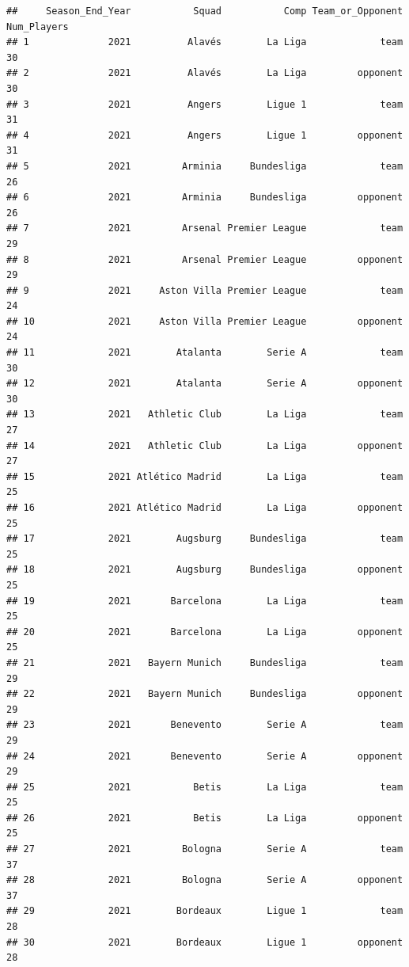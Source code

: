 \documentclass[
]{book}
\theoremstyle{definition}
\theoremstyle{definition}
\theoremstyle{definition}
\theoremstyle{definition}
\theoremstyle{remark}
\begin{document}
\begin{verbatim}
##     Season_End_Year           Squad           Comp Team_or_Opponent Num_Players
## 1              2021          Alavés        La Liga             team          30
## 2              2021          Alavés        La Liga         opponent          30
## 3              2021          Angers        Ligue 1             team          31
## 4              2021          Angers        Ligue 1         opponent          31
## 5              2021         Arminia     Bundesliga             team          26
## 6              2021         Arminia     Bundesliga         opponent          26
## 7              2021         Arsenal Premier League             team          29
## 8              2021         Arsenal Premier League         opponent          29
## 9              2021     Aston Villa Premier League             team          24
## 10             2021     Aston Villa Premier League         opponent          24
## 11             2021        Atalanta        Serie A             team          30
## 12             2021        Atalanta        Serie A         opponent          30
## 13             2021   Athletic Club        La Liga             team          27
## 14             2021   Athletic Club        La Liga         opponent          27
## 15             2021 Atlético Madrid        La Liga             team          25
## 16             2021 Atlético Madrid        La Liga         opponent          25
## 17             2021        Augsburg     Bundesliga             team          25
## 18             2021        Augsburg     Bundesliga         opponent          25
## 19             2021       Barcelona        La Liga             team          25
## 20             2021       Barcelona        La Liga         opponent          25
## 21             2021   Bayern Munich     Bundesliga             team          29
## 22             2021   Bayern Munich     Bundesliga         opponent          29
## 23             2021       Benevento        Serie A             team          29
## 24             2021       Benevento        Serie A         opponent          29
## 25             2021           Betis        La Liga             team          25
## 26             2021           Betis        La Liga         opponent          25
## 27             2021         Bologna        Serie A             team          37
## 28             2021         Bologna        Serie A         opponent          37
## 29             2021        Bordeaux        Ligue 1             team          28
## 30             2021        Bordeaux        Ligue 1         opponent          28

\end{verbatim}
\end{document}
